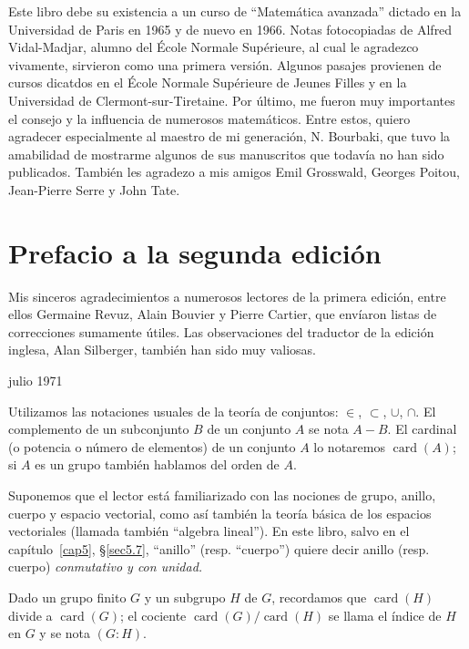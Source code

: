\documentclass[10pt,oneside,bibtotoc,smallheadings,leqno,a5paper,DIV=12]{scrbook}
\DeclareMathOperator{\card}{card}
\numberwithin{equation}{section}
\theoremstyle{defi}
\theoremstyle{enonce}
\theoremstyle{rem}
\numberwithin{theorem}{section}
\numberwithin{proposition}{section}
\numberwithin{definition}{section}
\numberwithin{lemma}{section}
\numberwithin{corollary}{section}
\numberwithin{example}{section}
\numberwithin{footnote}{section}%
\begin{document}
Este libro debe su existencia a un curso de ``Matem\'atica avanzada''
dictado en la Universidad de Paris en 1965 y de nuevo en 1966.
Notas fotocopiadas de {Alfred Vidal-Madjar,} alumno del \'Ecole
Normale Sup\'erieure, al cual le agradezco vivamente, sirvieron
como una primera versi\'on. Algunos pasajes provienen de cursos dicatdos
en el \'Ecole Normale Sup\'erieure de Jeunes Filles y en la Universidad
de Clermont-sur-Tiretaine. Por \'ultimo, me fueron muy importantes el consejo
y la influencia de numerosos matem\'aticos. Entre estos, quiero agradecer
especialmente al maestro de mi generaci\'on, {N. Bourbaki,} que tuvo la
amabilidad de mostrarme algunos de sus manuscritos que todav\'ia no han sido
publicados. Tambi\'en les agradezo a mis amigos {Emil Grosswald,} {Georges
Poitou,} {Jean-Pierre Serre} y {John Tate.}

\section*{Prefacio a la segunda edici\'on}

Mis sinceros agradecimientos a numerosos lectores de la primera
edici\'on, entre ellos Germaine Revuz, Alain Bouvier y Pierre Cartier,
que env\'iaron listas de correcciones sumamente \'utiles. Las observaciones
del traductor de la edici\'on inglesa, Alan Silberger, tambi\'en han sido
muy valiosas.

\begin{flushright}
julio 1971
\end{flushright}


Utilizamos las notaciones usuales de la teor\'ia de conjuntos:
$\in$, $\subset$, $\cup$, $\cap$.
El complemento de un subconjunto $B$ de un conjunto $A$ se nota $A - B$.
El cardinal (o potencia o n\'umero de elementos) de un conjunto $A$ lo notaremos
$\card(A)$; si $A$ es un grupo tambi\'en hablamos del orden de $A$.

Suponemos que el lector est\'a familiarizado
con las nociones de grupo, anillo, cuerpo y espacio vectorial,
como as\'i tambi\'en la teor\'ia b\'asica de los espacios vectoriales
(llamada tambi\'en ``algebra lineal''). En este libro, salvo en el cap\'itulo~\ref{cap5},
\S\ref{sec5.7}, ``anillo'' (resp. ``cuerpo'') quiere decir anillo (resp. cuerpo)
\emph{conmutativo y con unidad.}

Dado un grupo finito $G$ y un subgrupo $H$ de $G$, recordamos que $\card(H)$ divide
a $\card(G)$; el cociente $\card(G)/\card(H)$ se llama el \'indice de $H$ en $G$ y
se nota $(G:H)$.
\end{document}
